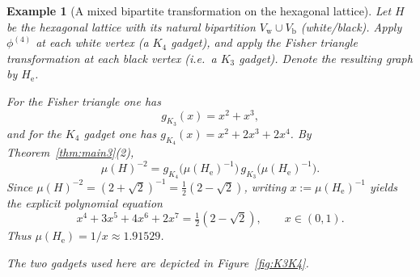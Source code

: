 \documentclass[12pt]{amsart}
\theoremstyle{plain}
\newtheorem{example}[theorem]{Example}
\numberwithin{equation}{section}
\numberwithin{theorem}{section}
\numberwithin{figure}{section}
\begin{document}
\begin{example}[A mixed bipartite transformation on the hexagonal lattice]\label{ex:hex-mixed}
Let $H$ be the hexagonal lattice with its natural bipartition $V_{\mathrm w}\cup V_{\mathrm b}$
(white/black).  Apply $\phi^{(4)}$ at each white vertex (a $K_4$ gadget), and apply the Fisher
triangle transformation at each black vertex (i.e.\ a $K_3$ gadget).  Denote the resulting
graph by $H_{\mathrm e}$.

For the Fisher triangle one has
\[
g_{K_3}(x)=x^2+x^3,
\]
and for the $K_4$ gadget one has $g_{K_4}(x)=x^2+2x^3+2x^4$.
By Theorem~\ref{thm:main3}(2),
\[
\mu(H)^{-2}=g_{K_4}\bigl(\mu(H_{\mathrm e})^{-1}\bigr)\,g_{K_3}\bigl(\mu(H_{\mathrm e})^{-1}\bigr).
\]
Since $\mu(H)^{-2}=(2+\sqrt2)^{-1}=\tfrac12(2-\sqrt2)$, writing $x:=\mu(H_{\mathrm e})^{-1}$ yields
the explicit polynomial equation
\begin{equation}\label{eq:hex-mixed-eqn}
x^4+3x^5+4x^6+2x^7=\tfrac12(2-\sqrt2),
\qquad x\in(0,1).
\end{equation}
Thus $\mu(H_{\mathrm e})=1/x \approx 1.91529$.

\smallskip
The two gadgets used here are depicted in Figure~\ref{fig:K3K4}.
\end{example}
\end{document}
